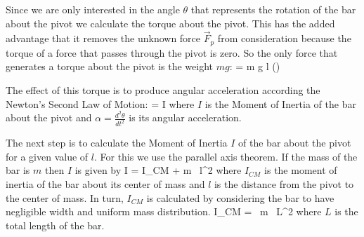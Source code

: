    \begin{center}
      
   \end{center}


   Since we are only interested in the angle $\theta$ that represents the rotation of the bar about the pivot we calculate the torque about the pivot. This has the added advantage that it removes the unknown force $\vec{F}_p$ from consideration because the torque of a force that passes through the pivot is zero. So the only force that generates a torque about the pivot is the weight $m g$:
   \beq
      \tau = m g l \sin(\theta)
   \eeq

   The effect of this torque is to produce angular acceleration according the Newton's Second Law of Motion:
   \beq
      \tau = I \alpha
   \eeq
   where $I$ is the Moment of Inertia of the bar about the pivot and $\alpha = \frac{d^2 \theta}{dt^2}$ is its angular acceleration.

   \vspace{\baselineskip} 
   The next step is to calculate the Moment of Inertia $I$ of the bar about the pivot for a given value of $l$. For this we use the parallel axis theorem. If the mass of the bar is $m$ then $I$ is given by
   \beq
      I = I_{CM} + m \, l^2
   \eeq
   where $I_{CM}$ is the moment of inertia of the bar about its center of mass and $l$ is the distance from the pivot to the center of mass. In turn, $I_{CM}$ is calculated by considering the bar to have negligible width and uniform mass distribution.
   \beq
      I_{CM} =  \, m \, L^2
   \eeq
   where $L$ is the total length of the bar.
